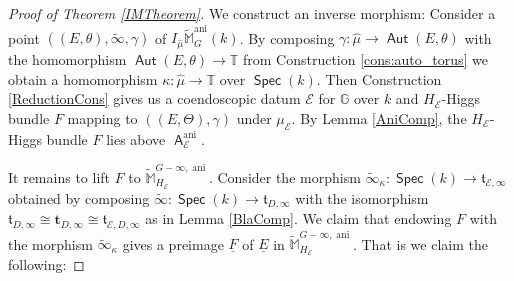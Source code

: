 \documentclass{article}
\DeclareMathOperator{\A}{\mathsf{A}}
\DeclareMathOperator{\ani}{ani}
\DeclareMathOperator{\Aut}{\mathsf{Aut}}
\DeclareMathOperator{\Spec}{\mathsf{Spec}}
\newcommand{\BG}{{\mathbb{G}}}
\newcommand{\BH}{{\mathbb{H}}}
\newcommand{\BM}{{\mathbb{M}}}
\newcommand{\BT}{{\mathbb{T}}}
\newcommand{\CE}{{\mathcal E}}
\theoremstyle{definition}
\theoremstyle{plain}
\begin{document}
\begin{proof}[Proof of Theorem \ref{IMTheorem}]

We construct an inverse morphism: Consider a point $((E,\theta),\tilde \infty,\gamma)$ of $I_{\hat\mu}\widetilde\BM^{\ani}_G(k)$. By composing $\gamma \colon \hat\mu \to \Aut(E,\theta)$ with the homomorphism $\Aut(E,\theta) \to \BT$ from Construction \ref{cons:auto_torus} we obtain a homomorphism $\kappa \colon \hat\mu \to \BT$ over $\Spec(k)$. Then Construction \ref{ReductionCons} gives us a coendoscopic datum $\CE$ for $\BG$ over $k$ and $H_\CE$-Higgs bundle $F$ mapping to $((E,\Theta),\gamma)$ under $\mu_\CE$. By Lemma \ref{AniComp}, the $H_\CE$-Higgs bundle $F$ lies above $\A_\CE^{\ani}$. 

It remains to lift $F$ to $\widetilde{\BM}^{G-\infty,\ani}_{H_\CE}$. Consider the morphism $\tilde \infty_\kappa\colon \Spec(k) \to \mathfrak{t}_{\CE,\infty}$ obtained by composing $\tilde\infty\colon \Spec(k) \to \mathfrak{t}_{D,\infty}$ with the isomorphism $\mathfrak{t}_{D,\infty} \cong \mathbf{t}_{D,\infty} \cong \mathfrak{t}_{\CE,D,\infty}$ as in Lemma \ref{BlaComp}. We claim that endowing $F$ with the morphism $\tilde \infty_\kappa$ gives a preimage $\underline F$ of $\underline E$ in $\widetilde{\BM}^{G-\infty,\ani}_{H_\CE}$. That is we claim the following:


\end{proof}
\end{document}
